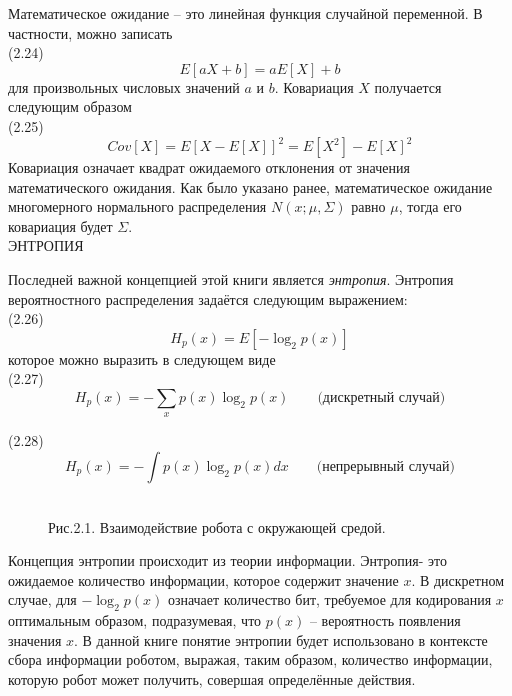 \documentclass[10pt,a4paper]{article}
\begin{document}
 Математическое ожидание – это линейная функция случайной переменной. В частности, можно записать\\
 
 (2.24) $$E[aX + b] = aE[X] + b$$
 для произвольных числовых значений $a$ и $b$. Ковариация $X$ получается следующим образом\\

 (2.25) $$Cov[X] = E[X-E[X]]^2=E[X^2]-E[X]^2$$
 Ковариация означает квадрат ожидаемого отклонения от значения математического ожидания. Как было указано ранее, математическое ожидание многомерного нормального распределения $N (x; \mu, \varSigma)$ равно $ \mu $, тогда  его ковариация будет  $ \varSigma $.\\
 ЭНТРОПИЯ
 
 Последней важной концепцией этой книги является \textit{энтропия}. Энтропия вероятностного распределения задаётся следующим выражением:\\

 (2.26) $$H_p(x) =E[-\log_2p(x)]$$
 которое можно выразить в следующем виде\\
 
 (2.27) $$H_p(x)=-\sum_{x}p(x) \log_2 p(x)\qquad\mbox {(дискретный случай)}$$ 

 (2.28) $$H_p(x) ={-}\int p(x) \log_2 p(x) dx\qquad\mbox {(непрерывный случай)}$$
 {}\\
 \begin{figure}[h]
 	\caption{ Рис.2.1. Взаимодействие робота с окружающей средой.}
 	\label{fig:21orig}
 \end{figure}
 

 Концепция энтропии происходит из теории информации. Энтропия- это ожидаемое количество информации, которое содержит значение $x$. В дискретном случае, для
 ${-}\log_2 p(x)$ означает количество бит, требуемое для кодирования $x$ оптимальным образом, подразумевая, что $p(x)$ – вероятность появления значения $x$. В данной книге понятие энтропии будет использовано в контексте сбора информации роботом, выражая, таким образом, количество информации, которую робот может получить, совершая определённые действия.\\ 
 
\end{document}
